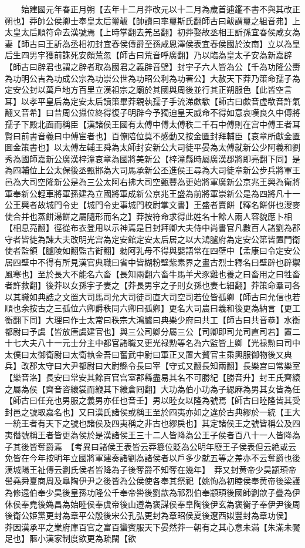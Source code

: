 　　始建國元年春正月朔【去年十二月莽改元以十二月為歲首逋鑑不書不與其改正朔也】莽帥公侯卿士奉皇太后璽韍【帥讀曰率璽斯氏翻師古曰韍謂璽之組音弗】上太皇太后順符命去漢號焉【上時掌翻去羌呂翻】初莽娶故丞相王訢孫宜春侯咸女為妻【師古曰王訢為丞相初封宜春侯傳爵至孫咸恩澤侯表宜春侯國於汝南】立以為皇后生四男宇獲前誅死安頗荒忽【師古曰荒音呼廣翻】乃以臨為皇太子安為新嘉辟【師古曰辟君也謂之辟者取為國君之義辟音壁】封宇子六人皆為公【千為功隆公夀為功明公吉為功成公宗為功崇公世為功昭公利為功著公】大赦天下莽乃策命孺子為定安公封以萬戶地方百里立漢祖宗之廟於其國與周後並行其正朔服色【此皆空言耳】以孝平皇后為定安太后讀策畢莽親執孺子手流涕歔欷【師古曰歔音虚欷音許氣翻又音希】曰昔周公攝位終得復子明辟今予獨迫皇天威命不得如意哀嘆良久中傅將孺子下殿北面而稱臣【漢諸侯王國有太傅中傅太傅秩二千石中傅則在宫中傅王者耳賢曰前書音義曰中傅宦者也】百僚陪位莫不感動又按金匱封拜輔臣【哀章所獻金匱圖金策書也】以太傅左輔王舜為太師封安新公大司徒平晏為太傅就新公少阿羲和劉秀為國師嘉新公廣漢梓潼哀章為國將美新公【梓潼縣時屬廣漢郡將即亮翻下同】是為四輔位上公太保後丞甄邯為大司馬承新公丕進侯王尋為大司徒章新公步兵將軍王邑為大司空隆新公是為三公太阿右拂大司空甄豐為更始將軍廣新公京兆王興為衛將軍奉新公輕車將軍孫建為立國將軍成新公京兆王盛為前將軍崇新公是為四將凡十一公王興者故城門令史【城門令史事城門校尉掌文書】王盛者賣餅【釋名餅併也溲麥使合并也蒸餅湯餅之屬隨形而名之】莽按符命求得此姓名十餘人兩人容貌應卜相【相息亮翻】徑從布衣登用以示神焉是日封拜卿大夫侍中尚書官凡數百人諸劉為郡守者皆徙為諫大夫改明光宫為定安館定安太后居之以大鴻臚府為定安公第皆置門衛使者監領【臚陵如翻監古䘖翻】勑阿乳母不得與嬰語常在四壁中【孟康曰令定安公居四壁中不得有所見漢官典職曰省中皆糊粉壁紫素界之畫古烈士釋名曰壁辟也辟禦風寒也】至於長大不能名六畜【長知兩翻六畜牛馬羊犬豕雞也養之曰畜用之曰牲畜者許救翻】後莽以女孫宇子妻之【莽長男宇之子則女孫也妻七細翻】莽策命羣司各以其職如典誥之文置大司馬司允大司徒司直大司空司若位皆孤卿【師古曰允信也若順也余按古之三孤位六卿爵秩同六卿曰孤卿】更名大司農曰羲和後更為納言【更工衡翻下同】大理曰作士太常曰秩宗大鴻臚曰典樂少府曰共工【師古曰共音恭】水衡都尉曰予虞【皆放唐虞建官也】與三公司卿分屬三公【司卿即司允司直司若】置二十七大夫八十一元士分主中都官諸職又更光禄勲等名為六監皆上卿【光禄勲曰司中太僕曰太御衛尉曰太衛執金吾曰奮武中尉曰軍正又置大贅官主乘輿服御物後又典兵】改郡太守曰大尹都尉曰大尉縣令長曰宰【守式又翻長知兩翻】長樂宫曰常樂室【樂音洛】長安曰常安其餘百官宫室郡縣盡易其名不可勝紀【勝音升】封王氏齊縗之屬為侯【齊音咨縗裳而緶其下縗倉囘翻】大功為伯小功為子緦麻為男其女皆為任【師古曰任充也男服之義男亦任也音壬】男以睦女以隆為號焉【師古曰睦隆皆其受封邑之號取嘉名也】又曰漢氏諸侯或稱王至於四夷亦如之違於古典繆於一統【王大一統王者有天下之號也諸侯及四夷稱之非古也繆戾也】其定諸侯王之號皆稱公及四夷僭號稱王者皆更為侯於是漢諸侯王三十二人皆降為公王子侯者百八十一人皆降為子其後皆奪爵焉　【考異曰諸侯王表皆云莽簒位貶為公明年廢王子侯表但云絶或云免皆在今年按明年立國將軍建奏諸劉為諸侯者以戶多少就五等之差亦不云奪爵也後漢城陽王祉傳云劉氏侯者皆降為子後奪爵不知奪在幾年】　莽又封黄帝少昊顓頊帝嚳堯舜夏商周及臯陶伊尹之後皆為公侯使各奉其祭祀【姚恂為初睦侯奉黄帝後梁護為修遠伯奉少昊後皇孫功隆公千奉帝嚳後劉歆為祁烈伯奉顓頊後國師劉歆子疊為伊休侯奉堯後媯昌為始睦侯奉虞帝後山遵為褒謀侯奉臯陶後伊玄為褒衡子奉伊尹後周後衛公姫黨更封為章平公殷後宋公孔弘更封為章昭侯夏後遼西姒豐封為章功侯】　莽因漢承平之業府庫百官之富百蠻賓服天下晏然莽一朝有之其心意未滿【朱滿未饜足也】陿小漢家制度欲更為疏闊【欲